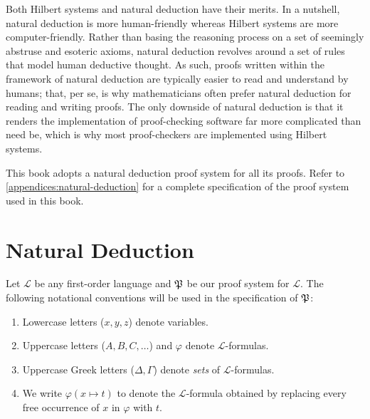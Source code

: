 \vspace{0.3cm}
\noindent
Both Hilbert systems and natural deduction have their merits.
In a nutshell, natural deduction is more human-friendly whereas Hilbert systems are more computer-friendly.
Rather than basing the reasoning process on a set of seemingly abstruse and esoteric axioms,
natural deduction revolves around a set of rules that model human deductive thought.
As such, proofs written within the framework of natural deduction are typically easier to read and understand by humans;
that, per se, is why mathematicians often prefer natural deduction for reading and writing proofs.
The only downside of natural deduction is that it renders the implementation of proof-checking software far more complicated than need be,
which is why most proof-checkers are implemented using Hilbert systems.

\vspace{0.3cm}
\noindent
This book adopts a natural deduction proof system for all its proofs.
Refer to \ref{appendices:natural-deduction} for a complete specification of the proof system used in this book.

\chapter{Natural Deduction}  \label{appendices:natural-deduction}

\begin{notation}
    Let \( \mathcal{L} \) be any first-order language and \( \mathfrak{P} \) be our proof system for \( \mathcal{L} \).
    The following notational conventions will be used in the specification of \( \mathfrak{P} \):
    \begin{enumerate}[topsep=2pt,noitemsep,label=\textup{\texttt{(\alph*)}}]
        \item Lowercase letters (\( x, y, z\)) denote variables.
        \item Uppercase letters (\( A,B,C,\dots \)) and \( \varphi \) denote \( \mathcal{L} \)-formulas.
        \item Uppercase Greek letters (\( \Delta, \Gamma \)) denote \emph{sets} of \( \mathcal{L} \)-formulas.
        \item We write \( \varphi(x \mapsto t) \) to denote the \( \mathcal{L} \)-formula obtained by replacing every free
            occurrence of \( x \) in \( \varphi \) with \( t \).
    \end{enumerate}
\end{notation}

